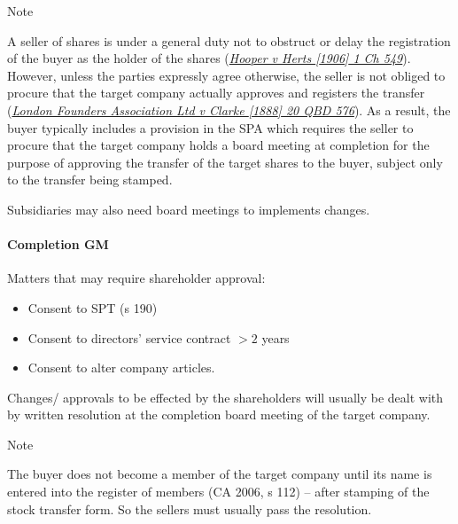 \documentclass[
]{article}
\providecommand{\tightlist}{%
  \setlength{\itemsep}{0pt}\setlength{\parskip}{0pt}}
\newenvironment{env-48e9bfc8-c3dd-4504-a5fa-3b34b9a27ccf}
{
    \savenotes\tcolorbox[blanker,breakable,left=5pt,borderline west={2pt}{-4pt}{blue}]
}
{
    \endtcolorbox\spewnotes
}
\begin{document}
\begin{env-48e9bfc8-c3dd-4504-a5fa-3b34b9a27ccf}

Note

A seller of shares is under a general duty not to obstruct or delay the
registration of the buyer as the holder of the shares
(\emph{\href{https://uk.westlaw.com/D-106-5776?originationContext=document\&transitionType=PLDocumentLink\&contextData=(sc.Default)\&ppcid=499185a9ecb940b1a3a505768c861e1b}{Hooper
v Herts {[}1906{]} 1 Ch 549}}). However, unless the parties expressly
agree otherwise, the seller is not obliged to procure that the target
company actually approves and registers the transfer
(\emph{\href{https://uk.westlaw.com/D-106-5778?originationContext=document\&transitionType=PLDocumentLink\&contextData=(sc.Default)\&ppcid=499185a9ecb940b1a3a505768c861e1b}{London
Founders Association Ltd v Clarke {[}1888{]} 20 QBD 576}}). As a result,
the buyer typically includes a provision in the SPA which requires the
seller to procure that the target company holds a board meeting at
completion for the purpose of approving the transfer of the target
shares to the buyer, subject only to the transfer being stamped.

\end{env-48e9bfc8-c3dd-4504-a5fa-3b34b9a27ccf}

Subsidiaries may also need board meetings to implements changes.

\hypertarget{completion-gm}{%
\paragraph{Completion GM}\label{completion-gm}}

Matters that may require shareholder approval:

\begin{itemize}
\tightlist
\item
  Consent to SPT (s 190)
\item
  Consent to directors' service contract {\(> 2\)} years
\item
  Consent to alter company articles.
\end{itemize}

Changes/ approvals to be effected by the shareholders will usually be
dealt with by written resolution at the completion board meeting of the
target company.

\begin{env-48e9bfc8-c3dd-4504-a5fa-3b34b9a27ccf}

Note

The buyer does not become a member of the target company until its name
is entered into the register of members (CA 2006, s 112) -- after
stamping of the stock transfer form. So the sellers must usually pass
the resolution.

\end{env-48e9bfc8-c3dd-4504-a5fa-3b34b9a27ccf}
\end{document}
